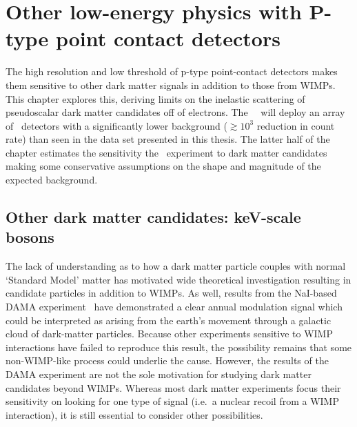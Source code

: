 \chapter{Other low-energy physics with P-type point contact detectors}

	

	The high resolution and low threshold of p-type point-contact detectors makes them sensitive to other dark matter signals in addition to those from WIMPs.  This chapter explores this, deriving limits on the inelastic scattering of pseudoscalar dark matter candidates off of electrons.  The \MJ~\minmod~will deploy an array of \ppc~detectors with a significantly lower background ($\gtrsim10^{3}$ reduction in count rate) than seen in the data set presented in this thesis.  The latter half of the chapter estimates the sensitivity the \MJ~experiment to dark matter candidates making some conservative assumptions on the shape and magnitude of the expected background.  
		
	\section{Other dark matter candidates: keV-scale bosons}
	\label{sec:CalcLimitsOnHeavyAxions}		

	The lack of understanding as to how a dark matter particle couples with normal `Standard Model' matter has motivated wide theoretical investigation resulting in candidate particles in addition to WIMPs.  As well, results from the NaI-based DAMA experiment~\cite{Bernabei:2005ca} have demonstrated a clear annual modulation signal which could be interpreted as arising from the earth's movement through a galactic cloud of dark-matter particles.  Because other experiments sensitive to WIMP interactions have failed to reproduce this result, the possibility remains that some non-WIMP-like process could underlie the cause.  However, the results of the DAMA experiment are not the sole motivation for studying dark matter candidates beyond WIMPs.  Whereas most dark matter experiments focus their sensitivity on looking for one type of signal (i.e.~a nuclear recoil from a WIMP interaction), it is still essential to consider other possibilities.  
	
